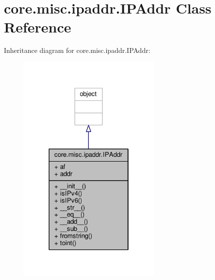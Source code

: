 \hypertarget{classcore_1_1misc_1_1ipaddr_1_1_i_p_addr}{\section{core.\+misc.\+ipaddr.\+I\+P\+Addr Class Reference}
\label{classcore_1_1misc_1_1ipaddr_1_1_i_p_addr}
}


Inheritance diagram for core.\+misc.\+ipaddr.\+I\+P\+Addr\+:
\nopagebreak
\begin{figure}[H]
\begin{center}
\leavevmode
\includegraphics[width=202pt]{classcore_1_1misc_1_1ipaddr_1_1_i_p_addr__inherit__graph}
\end{center}
\end{figure}


